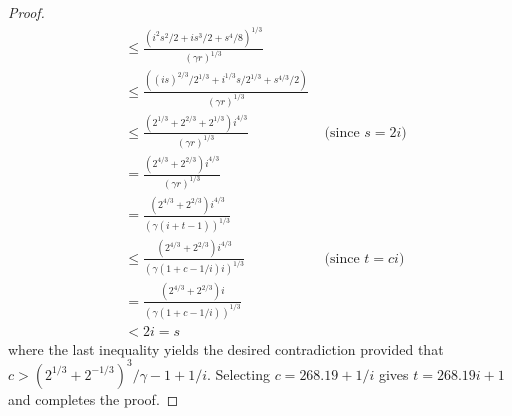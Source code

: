 \documentclass[12pt]{article}
\newcommand{\const}{268.19}
\begin{document}
\begin{proof}
\[\begin{aligned}
   &\le \frac{(i^2s^2/2 + is^3/2 + s^4/8)^{1/3}}{(\gamma r)^{1/3} }  \\
   &\le \frac{((is)^{2/3}/2^{1/3} + i^{1/3}s/2^{1/3} + s^{4/3}/2)}{(\gamma r)^{1/3}}  \\
   &\le \frac{(2^{1/3}+2^{2/3}+2^{1/3})i^{4/3}}{(\gamma r)^{1/3}}  
    & \mbox{ (since $s=2i$)} \\
   & = \frac{(2^{4/3} + 2^{2/3})i^{4/3}}{(\gamma r)^{1/3}}  \\
   & =  \frac{(2^{4/3} + 2^{2/3})i^{4/3}}{(\gamma(i+t-1))^{1/3}} \\ 
   &\le  \frac{(2^{4/3} + 2^{2/3})i^{4/3}}{(\gamma(1+c-1/i)i)^{1/3}}  
    & \mbox{ (since $t=ci$)} \\
   & =  \frac{(2^{4/3} + 2^{2/3})i}{(\gamma(1+c-1/i))^{1/3}} \\ 
   & < 2i = s
  \end{aligned}
\]
where the last inequality yields the desired contradiction provided that
$c > (2^{1/3} + 2^{-1/3})^3/\gamma-1+1/i$.  Selecting $c=\const+1/i$
gives $t=\const i + 1$ and completes the proof.
\end{proof}
\end{document}
